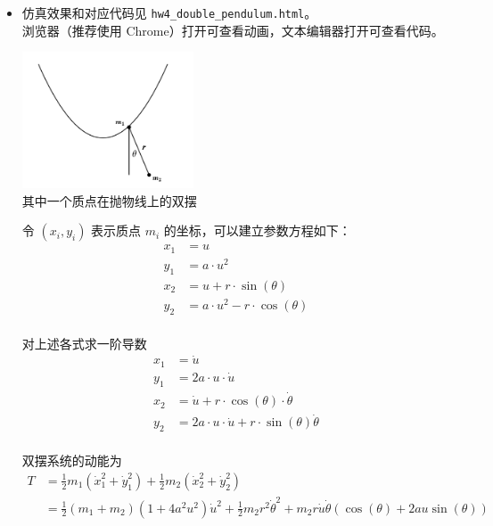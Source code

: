 \documentclass[a4paper, 12pt]{article}
\begin{document}
\begin{itemize}[leftmargin=2em, label={}]

\item 仿真效果和对应代码见 \texttt{hw4\_double\_pendulum.html}。\\
浏览器（推荐使用 Chrome）打开可查看动画，文本编辑器打开可查看代码。\\[-4ex]

\begin{center}
\includegraphics[width=0.4\textwidth]{images/parabola_x.png}\\
其中一个质点在抛物线上的双摆
\end{center}

\vspace{\baselineskip}

\setlength{\abovedisplayskip}{3pt}
\setlength{\belowdisplayskip}{3pt}

令 $(x_i,y_i)$ 表示质点 $m_i$ 的坐标，可以建立参数方程如下：
\begin{align*}
x_1 &= u \\
y_1 &= a\cdot u^2 \\
x_2 &= u + r\cdot \sin(\theta) \\
y_2 &= a \cdot u^2 - r\cdot \cos(\theta) \\
\end{align*}

对上述各式求一阶导数
\begin{align*}
x_1 &= \dot{u} \\
y_1 &= 2a\cdot u \cdot \dot{u} \\
x_2 &= \dot{u} + r\cdot \cos(\theta) \cdot \dot{\theta} \\
y_2 &= 2a \cdot u \cdot \dot{u} + r\cdot \sin(\theta) \dot{\theta} \\
\end{align*}

双摆系统的动能为
\begin{align*}
T &= \frac{1}{2} m_1 (\dot{x}^2_1 + \dot{y}^2_1) + \frac{1}{2} m_2 (\dot{x}^2_2 + \dot{y}^2_2)\\
  &= \frac{1}{2} (m_1+m_2) (1+4a^2u^2) \dot{u}^2 + \frac{1}{2} m_2 r^2 \dot{\theta}^2 + m_2 r \dot{u} \dot{\theta}(\cos(\theta)+2au\sin(\theta))
\end{align*}


\end{itemize}
\end{document}
